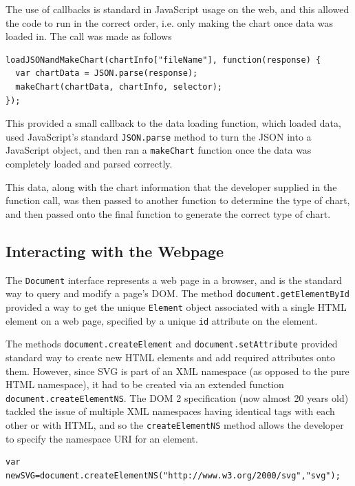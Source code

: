 \documentclass[ %
                    author={Aleena Baig},
                supervisor={Dr Simon Lock},
                    degree={BSc},
                     title={On Making Web Accessible Graphs},
                  subtitle={},
                      year={2019} ]{dissertation}
\begin{document}
The use of callbacks is standard in JavaScript usage on the web, and this allowed the code to run in the correct order, i.e. only making the chart once data was loaded in. The call was made as follows

\begin{lstlisting}
loadJSONandMakeChart(chartInfo["fileName"], function(response) {
  var chartData = JSON.parse(response);
  makeChart(chartData, chartInfo, selector);
});
\end{lstlisting}

This provided a small callback to the data loading function, which loaded data, used JavaScript's standard \texttt{JSON.parse} method to turn the JSON into a JavaScript object, and then ran a \texttt{makeChart} function once the data was completely loaded and parsed correctly.

This data, along with the chart information that the developer supplied in the function call, was then passed to another function to determine the type of chart, and then passed onto the final function to generate the correct type of chart.

\subsection{Interacting with the Webpage}

The \texttt{Document} interface represents a web page in a browser, and is the standard way to query and modify a page's DOM. The method \texttt{document.getElementById} provided a way to get the unique \texttt{Element} object associated with a single HTML element on a web page, specified by a unique \texttt{id} attribute on the element.


The methods \texttt{document.createElement} and \texttt{document.setAttribute} provided standard way to create new HTML elements and add required attributes onto them. However, since SVG is part of an XML namespace (as opposed to the pure HTML namespace), it had to be created via an extended function \texttt{document.createElementNS}. The DOM 2 specification (now almost 20 years old) tackled the issue of multiple XML namespaces having identical tags with each other or with HTML, and so the \texttt{createElementNS} method allows the developer to specify the namespace URI for an element.
\newline
\begin{lstlisting}
var newSVG=document.createElementNS("http://www.w3.org/2000/svg","svg");
\end{lstlisting}
\end{document}
